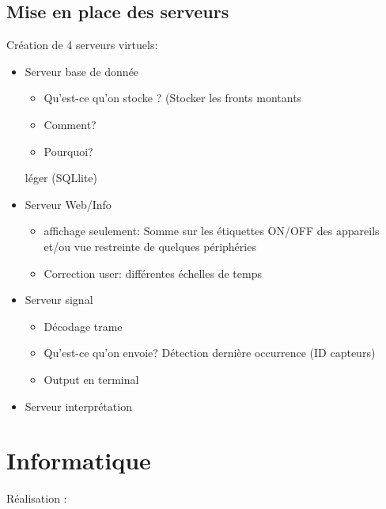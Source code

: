 \documentclass[10pt,a4paper]{article}
\begin{document}
\subsection{Mise en place des serveurs}

Création de 4 serveurs virtuels:

\begin{itemize}
\item Serveur base de donnée
\begin{itemize}
\item Qu'est-ce qu'on stocke ? (Stocker les fronts montants
\item Comment? 
\item Pourquoi?
\end{itemize} léger (SQLlite)
\end{itemize}

\begin{itemize}
\item Serveur Web/Info
\begin{itemize}
\item affichage seulement: Somme sur les étiquettes ON/OFF des appareils et/ou vue restreinte de quelques périphéries
\item Correction user: différentes échelles de temps
\end{itemize}
\end{itemize}

\begin{itemize}
\item Serveur signal
\begin{itemize}
\item Décodage trame
\item Qu'est-ce qu'on envoie? Détection dernière occurrence (ID capteurs)
\item Output en terminal	
\end{itemize}
\end{itemize}

\begin{itemize}
\item Serveur interprétation
\end{itemize}

\section{Informatique}
Réalisation :
\end{document}
